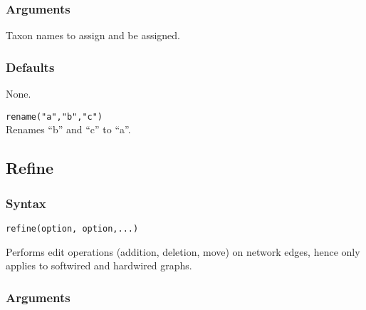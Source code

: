 	\subsubsection{Arguments}
		Taxon names to assign and be assigned.
		
	\subsubsection{Defaults}
		None.
		
	\begin{example}
	
		\item{\texttt{rename("a","b","c")}\\ Renames ``b'' and ``c'' to ``a''. }
				
	\end{example}

\subsection{Refine}
	\subsubsection{Syntax}
		\texttt{refine(option, option,...)}
		
	\begin{phygdescription}
		{Performs edit operations (addition, deletion, move) on network edges, hence only applies to softwired and hardwired graphs.}
	\end{phygdescription}

	\subsubsection{Arguments}
		
